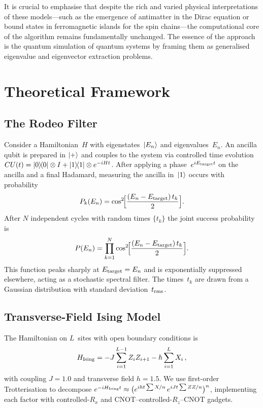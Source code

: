 \documentclass[twocolumn,10pt]{article}
\begin{document}
It is crucial to emphasise that despite the rich and varied physical interpretations 
of these models---such as the emergence of antimatter in the Dirac equation or 
bound states in ferromagnetic islands for the spin chains---the computational 
core of the algorithm remains fundamentally unchanged. The essence of the approach 
is the quantum simulation of quantum systems by framing them as generalised 
eigenvalue and eigenvector extraction problems.

\section{Theoretical Framework}\label{sec:theory}

\subsection{The Rodeo Filter}
Consider a Hamiltonian~$H$ with eigenstates~$\ket{E_n}$ and
eigenvalues~$E_n$.
An ancilla qubit is prepared in $\ket{+}$ and couples to the system via
controlled time evolution~$CU(t)=\ketbra{0}{0}\otimes I +
\ketbra{1}{1}\otimes e^{-iHt}$.
After applying a phase~$e^{iE_{\rm target}t}$ on the ancilla and a
final Hadamard, measuring the ancilla in~$\ket{1}$ occurs with
probability
\begin{equation}
  P_k(E_n) = \cos^{2}\!\Bigl[\frac{(E_n - E_{\rm target})\,t_k}{2}\Bigr].
  \label{eq:single}
\end{equation}
After $N$ independent cycles with random times $\{t_k\}$ the joint
success probability is
\begin{equation}
  P(E_n) = \prod_{k=1}^{N}
    \cos^{2}\!\Bigl[\frac{(E_n - E_{\rm target})\,t_k}{2}\Bigr].
  \label{eq:filter}
\end{equation}
This function peaks sharply at $E_{\rm target}=E_n$ and is exponentially
suppressed elsewhere, acting as a stochastic spectral filter.
The times~$t_k$ are drawn from a Gaussian distribution with
standard deviation~$t_{\rm rms}$.

\subsection{Transverse-Field Ising Model}
The Hamiltonian on $L$~sites with open boundary conditions is
\begin{equation}
  H_{\rm Ising} = -J\sum_{i=1}^{L-1} Z_i Z_{i+1}
                  -h\sum_{i=1}^{L} X_i\,,
  \label{eq:ising}
\end{equation}
with coupling $J=1.0$ and transverse field $h=1.5$.
We use first-order Trotterisation to decompose
$e^{-iH_{\rm Ising}t}\approx
\bigl(e^{iht\sum X/n}\,e^{iJt\sum ZZ/n}\bigr)^{n}$,
implementing each factor with controlled-$R_x$ and
CNOT--controlled-$R_z$--CNOT gadgets.
\end{document}
